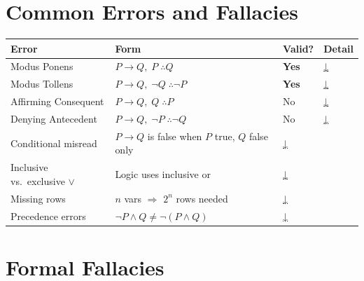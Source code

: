 
\section{Common Errors and Fallacies}

\begin{tcolorbox}[colback=gray!6, colframe=gray!40, arc=2pt,
  left=6pt, right=6pt, top=4pt, bottom=4pt,
  title={\small\textbf{Errors and Fallacies — Quick Reference}},
  fonttitle=\small\bfseries]
\small
\begin{tabular}{l l l l}
\toprule
\textbf{Error} & \textbf{Form} & \textbf{Valid?} & \textbf{Detail} \\
\midrule
Modus Ponens          & $P\to Q,\;P \;\therefore Q$          & \textbf{Yes} & \hyperref[def:mp-valid]{↓} \\
Modus Tollens         & $P\to Q,\;\neg Q \;\therefore \neg P$ & \textbf{Yes} & \hyperref[def:mt-valid]{↓} \\
Affirming Consequent  & $P\to Q,\;Q \;\therefore P$          & No           & \hyperref[def:aff-cons]{↓} \\
Denying Antecedent    & $P\to Q,\;\neg P \;\therefore \neg Q$ & No           & \hyperref[def:deny-ant]{↓} \\
\midrule
Conditional misread   & $P\to Q$ is false when $P$ true, $Q$ false only & \hyperref[rem:cond-error]{↓} \\
Inclusive vs.\ exclusive $\vee$ & Logic uses inclusive or & \hyperref[rem:or-error]{↓} \\
Missing rows          & $n$ vars $\Rightarrow$ $2^n$ rows needed & \hyperref[rem:rows-error]{↓} \\
Precedence errors     & $\neg P\wedge Q \neq \neg(P\wedge Q)$ & \hyperref[rem:prec-error]{↓} \\
\bottomrule
\end{tabular}
\end{tcolorbox}

\vspace{1em}

\section*{Formal Fallacies}

